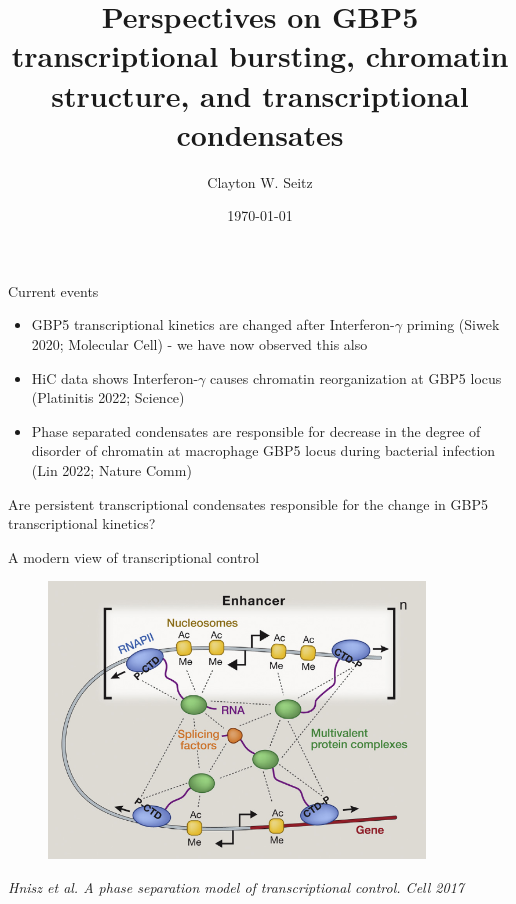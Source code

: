 \documentclass[aspectratio=1610]{beamer}					%
\title{Perspectives on GBP5 transcriptional bursting, chromatin structure, and transcriptional condensates}	%
\author{Clayton W. Seitz}								%
\date{\today}									%
\begin{document}
\begin{frame}
  \titlepage
\end{frame}


%

\begin{frame}{Current events}
\begin{itemize}
\item GBP5 transcriptional kinetics are changed after Interferon-$\gamma$ priming (Siwek 2020; Molecular Cell) - we have now observed this also
\item HiC data shows Interferon-$\gamma$ causes chromatin reorganization at GBP5 locus (Platinitis 2022; Science)
\item Phase separated condensates are responsible for decrease in the degree of disorder of chromatin at macrophage GBP5 locus during bacterial infection (Lin 2022; Nature Comm)
\end{itemize}
\vspace{0.2in}
Are persistent transcriptional condensates responsible for the change in GBP5 transcriptional kinetics?

\end{frame}

\begin{frame}{A modern view of transcriptional control}
\begin{figure}
\includegraphics[width=10cm]{figure-5-6.png}
\end{figure}
\textit{Hnisz et al. A phase separation model of transcriptional control. Cell 2017}
\end{frame}
\end{document}
